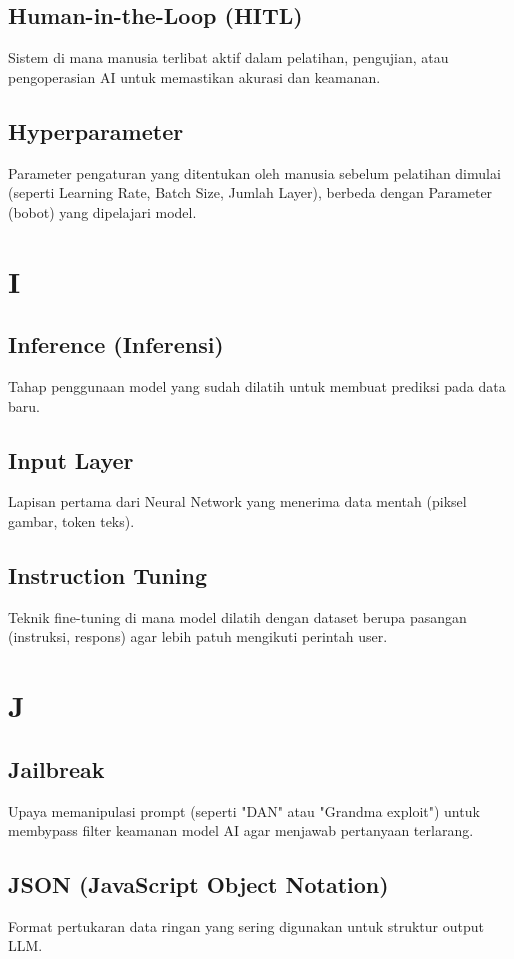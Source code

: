 \subsection*{Human-in-the-Loop (HITL)}
Sistem di mana manusia terlibat aktif dalam pelatihan, pengujian, atau pengoperasian AI untuk memastikan akurasi dan keamanan.

\subsection*{Hyperparameter}
Parameter pengaturan yang ditentukan oleh manusia sebelum pelatihan dimulai (seperti Learning Rate, Batch Size, Jumlah Layer), berbeda dengan Parameter (bobot) yang dipelajari model.

\section*{I}

\subsection*{Inference (Inferensi)}
Tahap penggunaan model yang sudah dilatih untuk membuat prediksi pada data baru.

\subsection*{Input Layer}
Lapisan pertama dari Neural Network yang menerima data mentah (piksel gambar, token teks).

\subsection*{Instruction Tuning}
Teknik fine-tuning di mana model dilatih dengan dataset berupa pasangan (instruksi, respons) agar lebih patuh mengikuti perintah user.

\section*{J}

\subsection*{Jailbreak}
Upaya memanipulasi prompt (seperti "DAN" atau "Grandma exploit") untuk membypass filter keamanan model AI agar menjawab pertanyaan terlarang.

\subsection*{JSON (JavaScript Object Notation)}
Format pertukaran data ringan yang sering digunakan untuk struktur output LLM.

